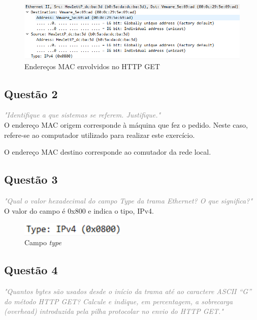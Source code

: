 \documentclass{llncs}
\newcommand{\questionE}[1]{\textcolor{gray}{\textit{"#1"}}}
\begin{document}
\begin{figure}[H]
\begin{center}
\includegraphics[width=12cm]{1.PNG}
\end{center}
\caption{Endereços MAC envolvidos no HTTP GET}
\end{figure}

\subsection{Questão 2}
\hspace{3mm}
\questionE{Identifique a que sistemas se referem. Justifique.}\\

O endereço MAC origem corresponde à máquina que fez o pedido. Neste caso, refere-se ao computador utilizado para realizar este exercício.

O endereço MAC destino corresponde ao comutador da rede local.

\subsection{Questão 3}
\hspace{3mm}
\questionE{Qual o valor hexadecimal do campo Type da trama Ethernet? O que significa?}\\

O valor do campo é 0x800 e indica o tipo, IPv4.

\begin{figure}[H]
\begin{center}
\includegraphics[width=5cm]{3.PNG}
\end{center}
\caption{Campo \textit{type}}
\end{figure}

\clearpage

\subsection{Questão 4}
\hspace{3mm}
\questionE{Quantos bytes são usados desde o início da trama até ao caractere ASCII “G” do método HTTP	GET? Calcule e indique, em percentagem, a sobrecarga (\textit{overhead}) introduzida pela pilha protocolar no envio do HTTP GET.}\\
\end{document}
